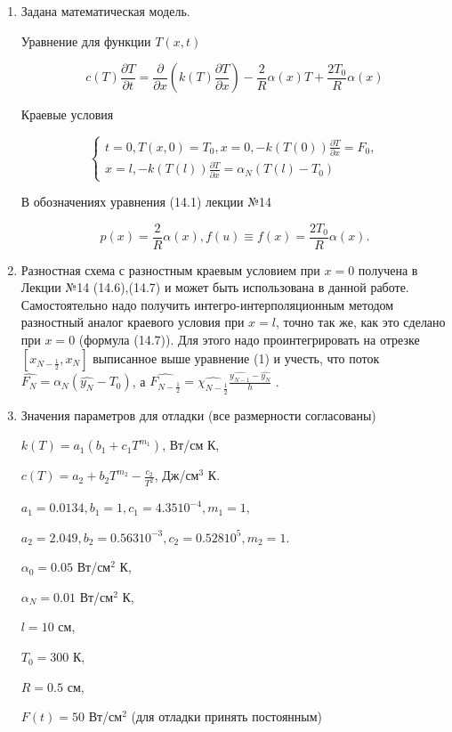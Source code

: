 \documentclass[a4paper,12pt]{article}
\begin{document}
	\begin{enumerate}
		\item Задана математическая модель.
		
		Уравнение для функции $T(x, t)$
		
		\begin{equation}
		c(T) \frac{\partial T}{\partial t} = \frac{\partial}{\partial x} \left(k(T) \frac{\partial T}{\partial x}\right) - \frac{2}{R} \alpha(x) T + \frac{2 T_0}{R} \alpha(x) 
		\end{equation}
		
		Краевые условия
		
		\[
		\begin{cases}
		t = 0, T(x, 0) = T_0,
		
		x = 0, -k(T(0))\frac{\partial T}{\partial x} = F_0,\\
		
		x = l, -k(T(l))\frac{\partial T}{\partial x} = \alpha_N(T(l) - T_0)
		\end{cases}
		\]
		
		В обозначениях уравнения (14.1) лекции №14
		
		\[p(x) = \frac{2}{R} \alpha(x), f(u) \equiv f(x) = \frac{2 T_0}{R} \alpha(x).\]
		
		\item Разностная схема с разностным краевым условием при $x = 0$ получена в Лекции №14 (14.6),(14.7) и может быть использована в данной работе. Самостоятельно надо получить интегро-интерполяционным методом разностный аналог краевого условия при $x = l$, точно так же, как это сделано при $x = 0$ (формула (14.7)). Для этого надо проинтегрировать на отрезке $[x_{N-\frac{1}{2}}, x_N]$ выписанное выше уравнение (1) и учесть, что поток $\widehat{F_N} = \alpha_N (\widehat{y_N} - T_0)$, а $\widehat{F_{N - \frac{1}{2}}} = \widehat{\chi_{N - \frac{1}{2}}} \frac{\widehat{y_{N - 1}} - \widehat{y_N}}{h}$ .
		
		\item Значения параметров для отладки (все размерности согласованы)
		
		$k(T) = a_1 (b_1 + c_1 T^{m_1})$, Вт/см К,
		
		$c(T) = a_2 + b_2 T^{m_2} - \frac{c_2}{T^2}$, Дж/см$^3$ К.
		
		$a_1 = 0.0134, b_1 = 1, c_1 = 4.35 10^{-4}, m_1 = 1,$
		
		$a_2 = 2.049, b_2 = 0.563 10^{-3}, c_2 = 0.528 10^5, m_2 = 1.$
		
		$\alpha_0 = 0.05$ Вт/см$^2$ К,
		
		$\alpha_N = 0.01$ Вт/см$^2$ К,
		
		$l = 10$ см,
		
		$T_0 = 300$ К,
		
		$R = 0.5$ см,
		
		$F(t) = 50$ Вт/см$^2$ (для отладки принять постоянным)
	\end{enumerate}
\end{document}
